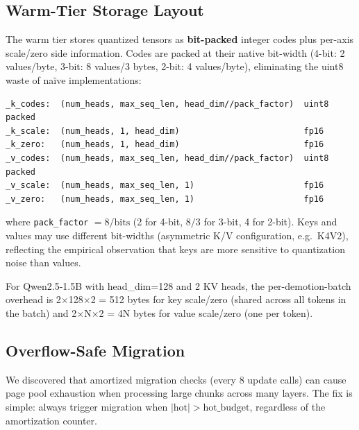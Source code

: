 \documentclass[11pt,a4paper]{article}
\begin{document}
\subsection{Warm-Tier Storage Layout}

The warm tier stores quantized tensors as \textbf{bit-packed} integer codes plus per-axis scale/zero side information. Codes are packed at their native bit-width (4-bit: 2 values/byte, 3-bit: 8 values/3 bytes, 2-bit: 4 values/byte), eliminating the uint8 waste of na\"ive implementations:

\begin{verbatim}
_k_codes:  (num_heads, max_seq_len, head_dim//pack_factor)  uint8 packed
_k_scale:  (num_heads, 1, head_dim)                         fp16
_k_zero:   (num_heads, 1, head_dim)                         fp16
_v_codes:  (num_heads, max_seq_len, head_dim//pack_factor)  uint8 packed
_v_scale:  (num_heads, max_seq_len, 1)                      fp16
_v_zero:   (num_heads, max_seq_len, 1)                      fp16
\end{verbatim}

where \texttt{pack\_factor} $= 8 / \text{bits}$ (2 for 4-bit, $8/3$ for 3-bit, 4 for 2-bit). Keys and values may use different bit-widths (asymmetric K/V configuration, e.g.\ K4V2), reflecting the empirical observation that keys are more sensitive to quantization noise than values.

For Qwen2.5-1.5B with head\_dim=128 and 2 KV heads, the per-demotion-batch overhead is 2$\times$128$\times$2 = 512 bytes for key scale/zero (shared across all tokens in the batch) and 2$\times$N$\times$2 = 4N bytes for value scale/zero (one per token).

\subsection{Overflow-Safe Migration}

We discovered that amortized migration checks (every 8 update calls) can cause page pool exhaustion when processing large chunks across many layers. The fix is simple: always trigger migration when $|\text{hot}| > \text{hot\_budget}$, regardless of the amortization counter.
\end{document}
